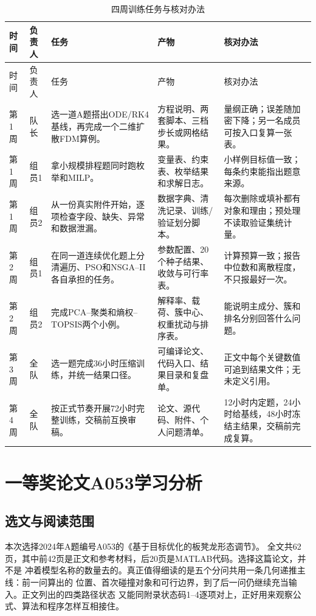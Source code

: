 \documentclass[UTF8,zihao=-4]{ctexart}
\begin{document}
\small
\begin{longtable}{p{1.3cm}p{1.3cm}p{3.9cm}p{4.7cm}p{4.15cm}}
\caption{四周训练任务与核对办法}\label{tab:four-week-plan}\\
\toprule
时间 & 负责人 & 任务 & 产物 & 核对办法\\
\midrule
\endfirsthead
\toprule
时间 & 负责人 & 任务 & 产物 & 核对办法\\
\midrule
\endhead
\bottomrule
\endfoot
第1周 & 队长 & 选一道A题搭出ODE/RK4基线，再完成一个二维扩散FDM算例。
& 方程说明、两套脚本、三档步长或网格结果。 & 量纲正确；误差随加密下降；另一名成员可按入口复算一张表。\\
第1周 & 组员1 & 拿小规模排程题同时跑枚举和MILP。 & 变量表、约束表、枚举结果和求解日志。 & 小样例目标值一致；每条约束能指出题意来源。\\
第1周 & 组员2 & 从一份真实附件开始，逐项检查字段、缺失、异常和数据泄漏。 & 数据字典、清洗记录、训练/验证划分脚本。 & 每次删除或填补都有对象和理由；预处理不读取验证集统计量。\\
第2周 & 组员1 & 在同一道连续优化题上分清遍历、PSO和NSGA--II各自承担的任务。 & 参数配置、20个种子结果、收敛与可行率表。 & 计算预算一致；报告中位数和离散程度，不只报最好一次。\\
第2周 & 组员2 & 完成PCA--聚类和熵权--TOPSIS两个小例。 & 解释率、载荷、簇中心、权重扰动与排序表。 & 能说明主成分、簇和排名分别回答什么问题。\\
第3周 & 全队 & 选一题完成36小时压缩训练，并统一结果口径。 & 可编译论文、代码入口、结果目录和复盘单。 & 正文中每个关键数值可追到结果文件；无未定义引用。\\
第4周 & 全队 & 按正式节奏开展72小时完整训练，交稿前互换审稿。 & 论文、源代码、附件、个人问题清单。 & 12小时内定题，24小时给基线，48小时冻结主结果，交稿前完成复算。\\
\end{longtable}
\normalsize

\section{一等奖论文A053学习分析}

\subsection{选文与阅读范围}

本次选择2024年A题编号A053的《基于目标优化的板凳龙形态调节》\cite{A053}。
全文共62页，其中前42页是正文和参考材料，后20页是MATLAB代码。选择这篇论文，并不是
冲着模型名称的数量去的。真正值得细读的是五个分问共用一条几何递推主线：前一问算出的
位置、首次碰撞对象和可行边界，到了后一问仍继续充当输入。正文列出的四类路径状态
又能同附录状态码1--4逐项对上，正好用来观察公式、算法和程序怎样互相接住。
\end{document}
